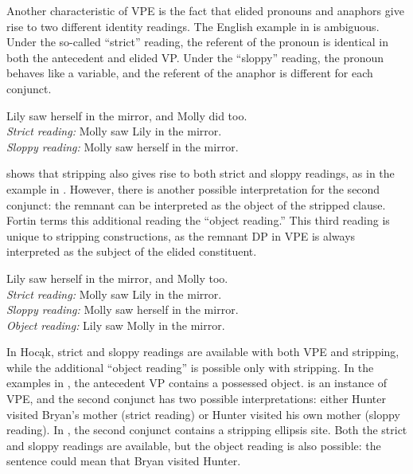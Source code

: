 \documentclass[output=paper]{LSP/langsci}
\begin{document}
Another characteristic of VPE is the fact that elided pronouns and anaphors give rise to two different identity readings. The English example in  is ambiguous. Under the so-called ``strict'' reading, the referent of the pronoun is identical in both the antecedent and elided VP. Under the ``sloppy'' reading, the pronoun behaves like a variable, and the referent of the anaphor is different for each conjunct.
  
\ea\label{ex:johnson:42} 
Lily saw herself in the mirror, and Molly did too.\\
\textit{Strict reading:} Molly saw Lily in the mirror.\\
\textit{Sloppy reading:} Molly saw herself in the mirror.
\z

\citealt{Fortin2007} shows that stripping also gives rise to both strict and sloppy readings, as in the example in . However, there is another possible interpretation for the second conjunct: the remnant can be interpreted as the object of the stripped clause. Fortin terms this additional reading the ``object reading.'' This third reading is unique to stripping constructions, as the remnant DP in VPE is always interpreted as the subject of the elided constituent. 
  
\ea\label{ex:johnson:43} 
Lily saw herself in the mirror, and Molly too.\\
\textit{Strict reading:} Molly saw Lily in the mirror.\\
\textit{Sloppy reading:} Molly saw herself in the mirror.\\
\textit{Object reading:} Lily saw Molly in the mirror.
\z

In Hocąk, strict and sloppy readings are available with both VPE and stripping, while the additional ``object reading'' is possible only with stripping. In the examples in , the antecedent VP contains a possessed object.  is an instance of VPE, and the second conjunct has two possible interpretations: either Hunter visited Bryan's mother (strict reading) or Hunter visited his own mother (sloppy reading). In , the second conjunct contains a stripping ellipsis site. Both the strict and sloppy readings are available, but the object reading is also possible: the sentence could mean that Bryan visited Hunter.
 
\end{document}
